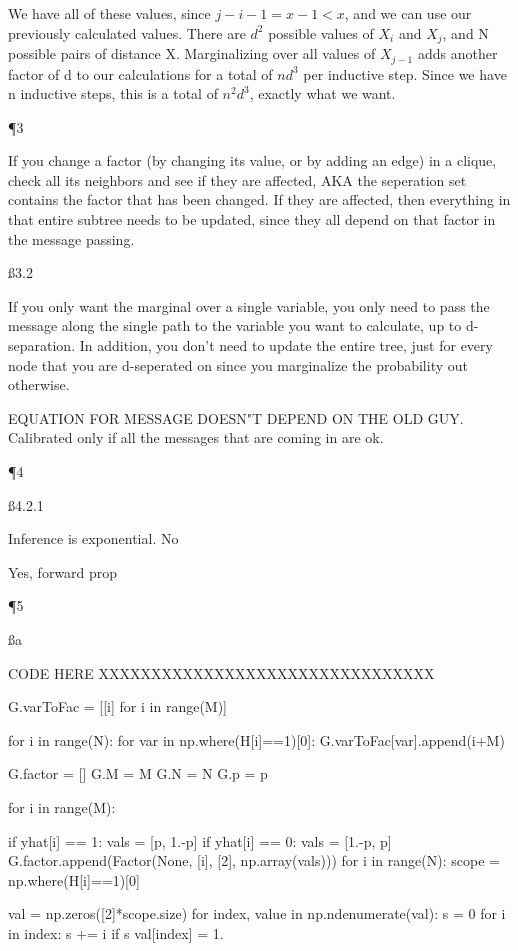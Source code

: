 We have all of these values, since $j-i-1 = x-1 <x$, and we can use our previously calculated values. There are $d^2$ possible values of $X_i$ and $X_j$, and N possible pairs of distance X. Marginalizing over all values of $X_{j-1}$ adds another factor of d to our calculations for a total of $nd^3$ per inductive step. Since we have n inductive steps, this is a total of $n^2d^3$, exactly what we want.

\P 3

If you change a factor (by changing its value, or by adding an edge) in a clique, check all its neighbors and see if they are affected, AKA the seperation set contains the factor that has been changed. If they are affected, then everything in that entire subtree needs to be updated, since they all depend on that factor in the message passing.

\ss{3.2}

If you only want the marginal over a single variable, you only need to pass the message along the single path to the variable you want to calculate, up to d-separation. In addition, you don't need to update the entire tree, just for every node that you are d-seperated on since you marginalize the probability out otherwise.

EQUATION FOR MESSAGE DOESN"T DEPEND ON THE OLD GUY. Calibrated only if all the messages that are coming in are ok.

\P 4

\ss{4.2.1}

Inference is exponential. 
No

Yes, forward prop

\P 5

\ss a

CODE HERE XXXXXXXXXXXXXXXXXXXXXXXXXXXXXXXX

    G.varToFac = [[i] for i in range(M)]

    for i in range(N):
        for var in np.where(H[i]==1)[0]:
            G.varToFac[var].append(i+M)

    G.factor = []
    G.M = M
    G.N = N
    G.p = p

    for i in range(M):

        if yhat[i] == 1:
            vals = [p, 1.-p]
        if yhat[i] == 0:
            vals = [1.-p, p]
        G.factor.append(Factor(None, [i], [2], np.array(vals)))
    for i in range(N):
        scope = np.where(H[i]==1)[0]

        val = np.zeros([2]*scope.size)
        for index, value in np.ndenumerate(val):
            s = 0
            for i in index:
                s += i
            if s%
                val[index] = 1.

